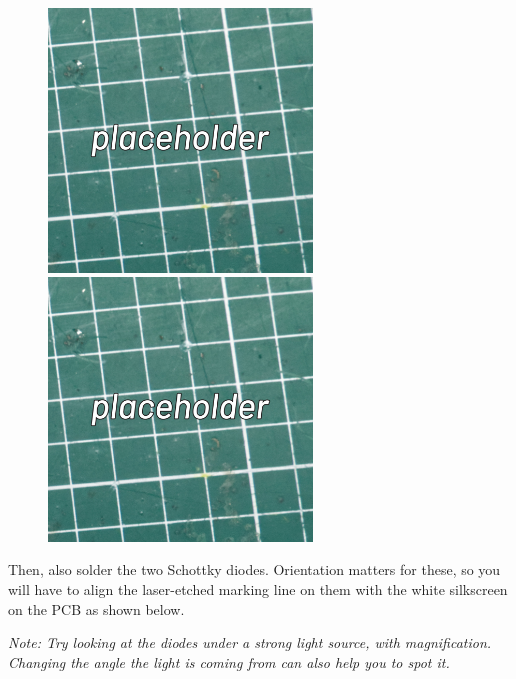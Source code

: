 \documentclass[12pt, a4paper]{article}
\begin{document}
\begin{figure}[H]
    \centering
    \includegraphics[width=7cm]{images/placeholder.jpg}
    \hspace{2mm}
    \includegraphics[width=7cm]{images/placeholder.jpg}
\end{figure}

Then, also solder the two Schottky diodes. Orientation matters for these, so you will have to
align the laser-etched marking line on them with the white silkscreen on the PCB as shown below.

\textit{Note: Try looking at the diodes under a strong light source, with magnification.
Changing the angle the light is coming from can also help you to spot it.}
\end{document}
